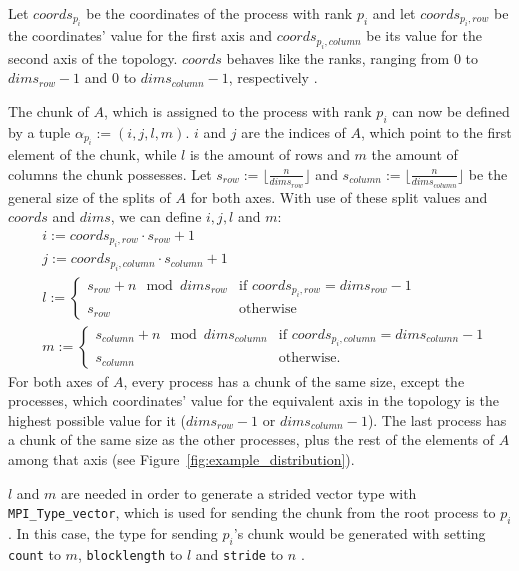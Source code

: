 \documentclass[twoside,11pt]{article}
\begin{document}
Let $coords_{p_i}$ be the coordinates of the process with
rank $p_i$ and let $coords_{p_i, row}$ be the coordinates'
value for the first axis and $coords_{p_i, column}$ be its
value for the second axis of the topology.
$coords$ behaves like the ranks, ranging from $0$ to
$dims_{row} - 1$ and $0$ to $dims_{column} - 1$,
respectively \citep[see][Chapter 7]{mpi}.

The chunk of $A$, which is assigned to the process with
rank $p_i$ can now be defined by a tuple
$\alpha_{p_i} := (i, j, l, m)$.
$i$ and $j$ are the indices of $A$, which point to the
first element of the chunk, while $l$ is the amount of rows
and $m$ the amount of columns the chunk possesses.
Let $s_{row} := \lfloor \frac{n}{dims_{row}} \rfloor$ and
$s_{column} := \lfloor \frac{n}{dims_{column}} \rfloor$ be
the general size of the splits of $A$ for both axes.
With use of these split values and $coords$ and $dims$, we
can define $i, j, l$ and $m$:
\begin{align*}
  &i := coords_{p_i,row} \cdot s_{row} + 1 \\
  &j := coords_{p_i, column} \cdot s_{column} + 1 \\
  &l := \begin{cases}
    s_{row} + n \mod dims_{row} &\text{if } coords_{p_i, row} = dims_{row} - 1 \\
    s_{row} &\text{otherwise}
  \end{cases} \\
  &m := \begin{cases}
    s_{column} + n \mod dims_{column} &\text{if } coords_{p_i, column} = dims_{column} - 1 \\
    s_{column} &\text{otherwise}.
  \end{cases}
\end{align*}
For both axes of $A$, every process has a chunk of the same
size, except the processes, which coordinates' value for
the equivalent axis in the topology is the highest possible
value for it ($dims_{row} - 1$ or $dims_{column} - 1$).
The last process has a chunk of the same size as the other
processes, plus the rest of the elements of $A$ among that
axis (see Figure~\ref{fig:example_distribution}).

$l$ and $m$ are needed in order to generate a strided
vector type with \texttt{MPI\_Type\_vector}, which is used
for sending the chunk from the root process to $p_i$.
In this case, the type for sending $p_i$'s chunk would be
generated with setting \texttt{count} to $m$,
\texttt{blocklength} to $l$ and \texttt{stride} to $n$
\citep[see][Chapter 4]{mpi}.
\end{document}
